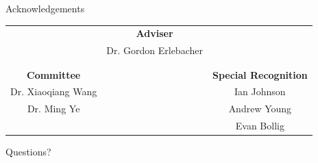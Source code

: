 \documentclass[red]{beamer}
\begin{document}
\begin{frame}{Acknowledgements}
	\begin{table}[htdp]
	\begin{center}
	\begin{tabular}{ccc}
	 & \textbf{Adviser} &\\
	 & Dr. Gordon Erlebacher &\\ 
	& &  \\
	& &  \\ 
	\textbf{Committee} 		&&  \textbf{Special Recognition}\\ 
	Dr. Xiaoqiang Wang 	&&  Ian Johnson\\ 
	Dr. Ming Ye 			&&  Andrew Young\\ 
	 					&&   Evan Bollig \\
	\end{tabular} 
	\end{center}
	\end{table}
\end{frame}

\begin{frame}
	\begin{center}
	Questions?
	\end{center}
\end{frame}
\end{document}
